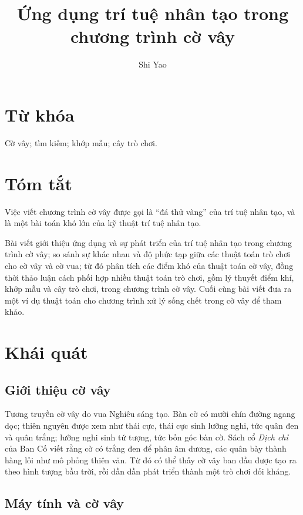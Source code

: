 \documentclass[11pt]{article}
\title{Ứng dụng trí tuệ nhân tạo trong chương trình cờ vây}
\author{Shi Yao}
\date{}
\begin{document}
\maketitle


\section*{Từ khóa}

Cờ vây; tìm kiếm; khớp mẫu; cây trò chơi.

\section*{Tóm tắt}

Việc viết chương trình cờ vây được gọi là ``đá thử vàng'' của trí tuệ nhân
tạo, và là một bài toán khó lớn của kỹ thuật trí tuệ nhân tạo.

Bài viết giới thiệu ứng dụng và sự phát triển của trí tuệ nhân tạo trong
chương trình cờ vây; so sánh sự khác nhau và độ phức tạp giữa các thuật toán
trò chơi cho cờ vây và cờ vua; từ đó phân tích các điểm khó của thuật toán cờ
vây, đồng thời thảo luận cách phối hợp nhiều thuật toán trò chơi, gồm lý
thuyết điểm khí, khớp mẫu và cây trò chơi, trong chương trình cờ vây. Cuối
cùng bài viết đưa ra một ví dụ thuật toán cho chương trình xử lý sống chết
trong cờ vây để tham khảo.

\section{Khái quát}

\subsection{Giới thiệu cờ vây}

Tương truyền cờ vây do vua Nghiêu sáng tạo. Bàn cờ có mười chín đường ngang
dọc; thiên nguyên được xem như thái cực, thái cực sinh lưỡng nghi, tức quân
đen và quân trắng; lưỡng nghi sinh tứ tượng, tức bốn góc bàn cờ. Sách cổ
\textit{Dịch chỉ} của Ban Cố viết rằng cờ có trắng đen để phân âm dương, các
quân bày thành hàng lối như mô phỏng thiên văn. Từ đó có thể thấy cờ vây ban
đầu được tạo ra theo hình tượng bầu trời, rồi dần dần phát triển thành một
trò chơi đối kháng.

\subsection{Máy tính và cờ vây}
\end{document}
